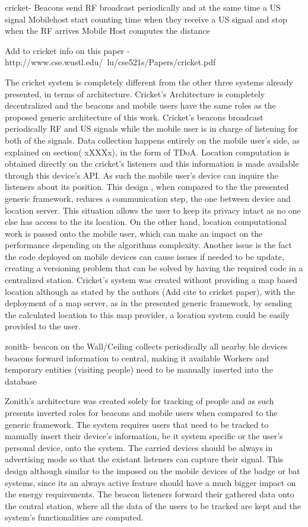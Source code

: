cricket- 	Beacons send RF broadcast periodically and at the same time a US signal
			Mobilehost start counting time when they receive a US signal and stop when the RF arrives
			Mobile Host computes the distance

Add to cricket info on this paper - http://www.cse.wustl.edu/~lu/cse521s/Papers/cricket.pdf


The cricket system is completely different from the other three systems already presented, in terms of architecture. Cricket's Architecture is completely decentralized and the beacons and mobile users have the same roles as the proposed generic architecture of this work. Cricket's beacons broadcast periodically RF and US signals while the mobile user is in charge of listening for both of the signals. Data collection happens entirely on the mobile user's side, as explained on section( xXXXx), in the form of \ac{TDoA}. Location computation is obtained directly on the cricket's listeners and this information is made available through this device's API. As such the mobile user's device can inquire the listeners about its position. This design , when compared to the the presented generic framework, reduces a communication step, the one between device and location server. This situation allows the user to keep its privacy intact as no one else has access to the its location. On the other hand, location computational work is passed onto the mobile user, which can make an impact on the performance depending on the algorithms complexity. Another issue is the fact the code deployed on mobile devices can cause issues if needed to be update, creating a versioning problem that can be solved by having the required code in a centralized station. Cricket's system was created without providing a map based location although as stated by the authors (Add cite to cricket paper), with the deployment of a map server, as in the presented generic framework, by sending the calculated location to this map provider, a location system could be easily provided to the user.


zonith- 	beacon on the Wall/Ceiling collects periodically all nearby ble devices
			beacons forward information to central, making it available
			Workers and temporary entities (visiting people) need to be manually inserted into the database

Zonith's architecture was created solely for tracking of people and as such presents inverted roles for beacons and mobile users when compared to the generic framework. The system requires users that need to be tracked to manually insert their device's information, be it system specific or the user's personal device, onto the system. The carried devices should be always in advertising mode so that the existant listeners can capture their signal. This design although similar to the imposed on the mobile devices of the badge or bat systems, since its an always active feature should have a much bigger impact on the energy requirements. The beacon listeners forward their gathered data onto the central station, where all the data of the users to be tracked are kept and the system's functionalities are computed. 


